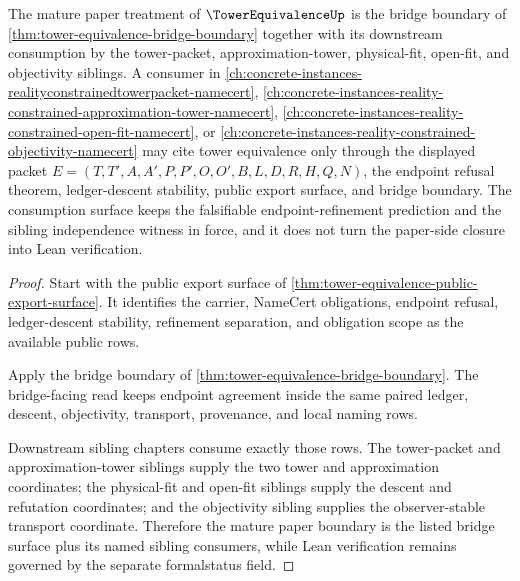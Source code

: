 \begin{theorem}
\label{thm:tower-equivalence-mature-consumption-boundary}
The mature paper treatment of $\TowerEquivalenceUp$ is the bridge boundary of \autoref{thm:tower-equivalence-bridge-boundary} together with its downstream consumption by the tower-packet, approximation-tower, physical-fit, open-fit, and objectivity siblings. A consumer in \autoref{ch:concrete-instances-realityconstrainedtowerpacket-namecert}, \autoref{ch:concrete-instances-reality-constrained-approximation-tower-namecert}, \autoref{ch:concrete-instances-reality-constrained-open-fit-namecert}, or \autoref{ch:concrete-instances-reality-constrained-objectivity-namecert} may cite tower equivalence only through the displayed packet $E=(T,T',A,A',P,P',O,O',B,L,D,R,H,Q,N)$, the endpoint refusal theorem, ledger-descent stability, public export surface, and bridge boundary. The consumption surface keeps the falsifiable endpoint-refinement prediction and the sibling independence witness in force, and it does not turn the paper-side closure into Lean verification.
\end{theorem}
\begin{proof}
Start with the public export surface of \autoref{thm:tower-equivalence-public-export-surface}. It identifies the carrier, NameCert obligations, endpoint refusal, ledger-descent stability, refinement separation, and obligation scope as the available public rows.

Apply the bridge boundary of \autoref{thm:tower-equivalence-bridge-boundary}. The bridge-facing read keeps endpoint agreement inside the same paired ledger, descent, objectivity, transport, provenance, and local naming rows.

Downstream sibling chapters consume exactly those rows. The tower-packet and approximation-tower siblings supply the two tower and approximation coordinates; the physical-fit and open-fit siblings supply the descent and refutation coordinates; and the objectivity sibling supplies the observer-stable transport coordinate. Therefore the mature paper boundary is the listed bridge surface plus its named sibling consumers, while Lean verification remains governed by the separate formalstatus field.
\end{proof}


